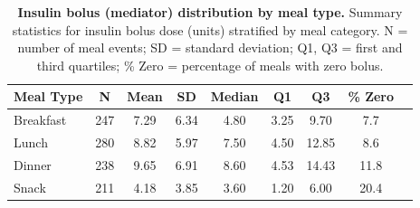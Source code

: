 \begin{table}[ht]
\centering
\small
\caption{\textbf{Insulin bolus (mediator) distribution by meal type.}
Summary statistics for insulin bolus dose (units) stratified by meal category.
N = number of meal events; SD = standard deviation; Q1, Q3 = first and third quartiles; \% Zero = percentage of meals with zero bolus.}
\label{tab:mediator_meal}
\begin{tabular}{lcccccccc}
\toprule
Meal Type & N & Mean & SD & Median & Q1 & Q3 & \% Zero \\
\midrule
Breakfast & 247 & 7.29 & 6.34 & 4.80 & 3.25 & 9.70 & 7.7 \\
Lunch & 280 & 8.82 & 5.97 & 7.50 & 4.50 & 12.85 & 8.6 \\
Dinner & 238 & 9.65 & 6.91 & 8.60 & 4.53 & 14.43 & 11.8 \\
Snack & 211 & 4.18 & 3.85 & 3.60 & 1.20 & 6.00 & 20.4 \\
\bottomrule
\end{tabular}
\end{table}
